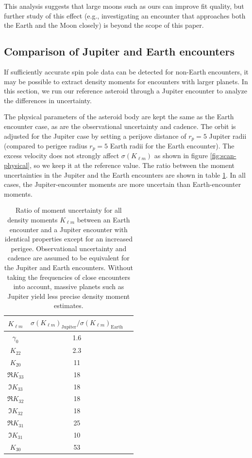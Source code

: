 \documentclass[fleqn,usenatbib]{mnras}
\begin{document}
This analysis suggests that large moons such as ours can improve fit quality, but further study of this effect (e.g., investigating an encounter that approaches both the Earth and the Moon closely) is beyond the scope of this paper.



\subsection{Comparison of Jupiter and Earth encounters}
\label{sec:jupiter-earth}

If sufficiently accurate spin pole data can be detected for non-Earth encounters, it may be possible to extract density moments for encounters with larger planets. In this section, we run our reference asteroid through a Jupiter encounter to analyze the differences in uncertainty.

The physical parameters of the asteroid body are kept the same as the Earth encounter case, as are the observational uncertainty and cadence. The orbit is adjusted for the Jupiter case by setting a perijove distance of $r_p=5$ Jupiter radii (compared to perigee radius $r_p=5$ Earth radii for the Earth encounter). The excess velocity does not strongly affect $\sigma(K_{\ell m})$ as shown in figure \ref{fig:scan-physical}, so we keep it at the reference value. The ratio between the moment uncertainties in the Jupiter and the Earth encounters are shown in table \ref{tab:jupiter-uncertainty}. In all cases, the Jupiter-encounter moments are more uncertain than Earth-encounter moments.

\begin{table}
  \centering
  \begin{tabular}{c|cc}
    \hline 
    $K_{\ell m}$ & $\sigma(K_{\ell m})_\text{Jupiter}/\sigma(K_{\ell m})_\text{Earth}$\\ \hline 
    $\gamma_0$ & 1.6 \\
    $K_{22}$ & 2.3 \\
    $K_{20}$ & 11 \\
    $\Re K_{33}$ & 18 \\
    $\Im K_{33}$ & 18 \\
    $\Re K_{32}$ & 18 \\
    $\Im K_{32}$ & 18 \\
    $\Re K_{31}$ & 25 \\
    $\Im K_{31}$ & 10 \\
    $K_{30}$ & 53 \\ \hline
  \end{tabular}
  \caption{Ratio of moment uncertainty for all density moments $K_{\ell m}$ between an Earth encounter and a Jupiter encounter with identical properties except for an increased perigee. Observational uncertainty and cadence are assumed to be equivalent for the Jupiter and Earth encounters. Without taking the frequencies of close encounters into account, massive planets such as Jupiter yield less precise density moment estimates.}
  \label{tab:jupiter-uncertainty}
\end{table}
\end{document}

